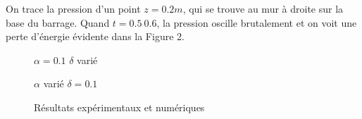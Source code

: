 \documentclass{article}
\begin{document}
On trace la pression d'un point $z=0.2m$, qui se trouve au mur à droite sur la base du barrage. Quand $t=0.5~0.6$, la pression oscille brutalement et on voit une perte d'énergie évidente dans la Figure 2. 
\begin{figure}[H]
	\begin{minipage}[H]{0.49\linewidth}
		{$\alpha=0.1$ $\delta$ varié}
	\end{minipage}
	\hfill
	\begin{minipage}[H]{0.49\linewidth}
		{$\alpha$ varié $\delta=0.1$}
	\end{minipage}
	\caption{Résultats expérimentaux et numériques}
\end{figure}
\end{document}
